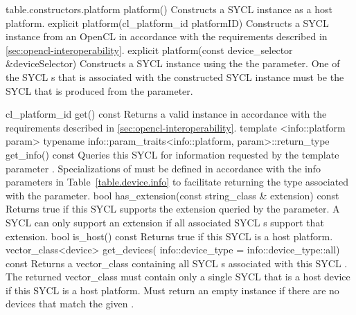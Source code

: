 
{table.constructors.platform}
  \addRow
    {platform()}
    {
      Constructs a SYCL  instance as a host platform.
    }
  \addRow
    {explicit platform(cl_platform_id platformID)}
    {    
     Constructs a SYCL  instance from an OpenCL  in accordance with the requirements described in \ref{sec:opencl-interoperability}.
    }
  \addRow
    {explicit platform(const device_selector \&deviceSelector)}
    {
      Constructs a SYCL  instance using the the  parameter. One of the SYCL s that is associated with the constructed SYCL  instance must be the SYCL  that is produced from the  parameter.
    }
\completeTable

  \addRow
    {cl_platform_id get() const}
    {  
      Returns a valid  instance in accordance with the requirements described in \ref{sec:opencl-interoperability}.    
    }
  \addRowThreeL
    {template <info::platform param>}
    {  typename info::param_traits<info::platform, param>::return_type}
    {  get_info() const}
    {
      Queries this SYCL  for information requested by the template parameter .
      Specializations of  must be defined in accordance with the info parameters in Table~\ref{table.device.info} to facilitate returning the type associated with the  parameter.
    }
  \addRow
    {bool has_extension(const string_class \& extension) const}
    {
      Returns true if this SYCL  supports the extension queried by the  parameter. A SYCL  can only support an extension if all associated SYCL s support that extension.
    }
  \addRow
    {bool is_host() const}
    {
      Returns true if this SYCL  is a host platform.
    }
  \addRowTwoL
    {vector_class<device> get_devices(}
    {  info::device_type = info::device_type::all) const}
    {
      Returns a vector_class containing all SYCL s associated with this SYCL . The returned vector_class must contain only a single SYCL  that is a host device if this SYCL  is a host platform.
      Must return an empty  instance if there are no
      devices that match the given .
    }
\completeTable

